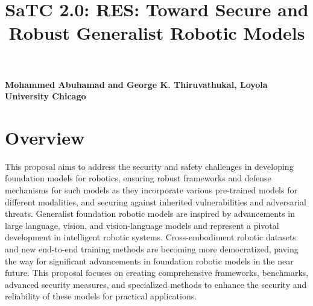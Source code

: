 \documentclass[11pt,letterpaper]{article}
\begin{document}
%
%
\pagestyle{empty} 
%
%
\setlength{\baselineskip}{12.6pt} %
\setlength{\normalbaselineskip}{12.6pt} %



\title{\Large
SaTC 2.0: RES: Toward Secure and Robust Generalist Robotic Models}
\begin{center}
   {\bfseries\filcenter
Mohammed Abuhamad and George K. Thiruvathukal,  Loyola University Chicago} 
\end{center}



\section{Overview}

This proposal aims to address the security and safety challenges in developing foundation models for robotics, ensuring robust frameworks and defense mechanisms for such models as they incorporate various pre-trained models for different modalities, and securing against inherited vulnerabilities and adversarial threats.
Generalist foundation robotic models are inspired by advancements in large language, vision, and vision-language models and represent a pivotal development in intelligent robotic systems. 
Cross-embodiment robotic datasets and new end-to-end training methods are becoming more democratized, paving the way for significant advancements in foundation robotic models in the near future.
This proposal focuses on creating comprehensive frameworks, benchmarks, advanced security measures, and specialized methods to enhance the security and reliability of these models for practical applications.
\end{document}
